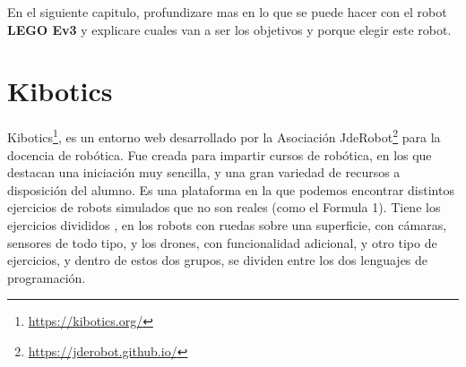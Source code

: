 En el siguiente capitulo, profundizare mas en lo que se puede hacer con el robot \textbf{LEGO Ev3} y explicare cuales van a ser los objetivos y porque elegir este robot.

\section{Kibotics}
\label{sec:kibotics}
Kibotics\footnote{\url{https://kibotics.org/}}, es un entorno web desarrollado por la Asociación JdeRobot\footnote{\url{https://jderobot.github.io/}} para la docencia de robótica. Fue creada para impartir cursos de robótica, en los que destacan una iniciación muy sencilla, y una gran variedad de recursos a disposición del alumno.
Es una plataforma en la que podemos encontrar distintos ejercicios de robots simulados que no son reales (como el Formula 1). Tiene los ejercicios divididos , en los robots con ruedas sobre una superficie, con cámaras, sensores de todo tipo, y los drones, con funcionalidad adicional, y otro tipo de ejercicios, y dentro de estos dos grupos, se dividen entre los dos lenguajes de programación. \newline
 
